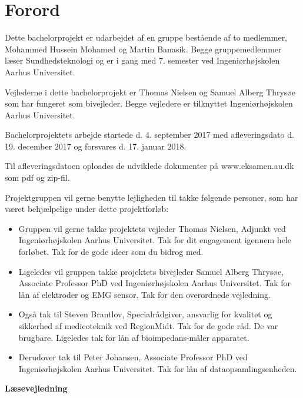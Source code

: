 \chapter{Forord}

Dette bachelorprojekt er udarbejdet af en gruppe bestående af to medlemmer, Mohammed Hussein Mohamed og Martin Banasik. Begge gruppemedlemmer læser Sundhedsteknologi og er i gang med 7. semester ved Ingeniørhøjskolen Aarhus Universitet.

Vejlederne i dette bachelorprojekt er Thomas Nielsen og Samuel Alberg Thrysøe som har fungeret som bivejleder. Begge vejledere er tilknyttet Ingeniørhøjskolen Aarhus Universitet.

Bachelorprojektets arbejde startede d. 4. september 2017  med afleveringsdato d. 19. december 2017 og forsvares d. 17. januar 2018.

Til afleveringsdatoen oploades de udviklede dokumenter på www.eksamen.au.dk som pdf og zip-fil. 

Projektgruppen vil gerne benytte lejligheden til takke følgende personer, som har været behjælpelige under dette projektforløb:

\begin{itemize}
\item	Gruppen vil gerne takke projektets vejleder Thomas Nielsen, Adjunkt ved Ingeniørhøjskolen Aarhus Universitet. Tak for dit engagement igennem  hele forløbet. Tak for de gode ideer som du bidrog med.  

\item Ligeledes vil gruppen takke projektets bivejleder Samuel Alberg Thrysøe, Associate Professor PhD ved Ingeniørhøjskolen Aarhus Universitet. Tak for lån af elektroder og EMG sensor. Tak for den overordnede vejledning.   

\item Også tak til Steven Brantlov, Specialrådgiver, ansvarlig for kvalitet og sikkerhed af medicoteknik ved RegionMidt. Tak for de gode råd. De var brugbare. Ligeledes tak for lån af bioimpedans-måler apparatet.  

\item Derudover tak til Peter Johansen, Associate Professor PhD ved Ingeniørhøjskolen Aarhus Universitet. Tak for lån af dataopsamlingsenheden. 
  
\end{itemize}

\pagebreak

\textbf{Læsevejledning}\\

